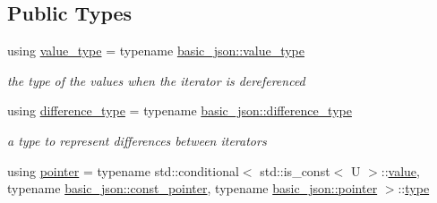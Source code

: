 \subsection*{Public Types}
\begin{DoxyCompactItemize}
\item 
using \hyperlink{classnlohmann_1_1basic__json_1_1iter__impl_a4d0518f3f2edae9dbaf7ef02f4f20add}{value\+\_\+type} = typename \hyperlink{classnlohmann_1_1basic__json_a2b3297873b70c080837e8eedc4fec32f}{basic\+\_\+json\+::value\+\_\+type}\hypertarget{classnlohmann_1_1basic__json_1_1iter__impl_a4d0518f3f2edae9dbaf7ef02f4f20add}{}\label{classnlohmann_1_1basic__json_1_1iter__impl_a4d0518f3f2edae9dbaf7ef02f4f20add}

\begin{DoxyCompactList}\small\item\em the type of the values when the iterator is dereferenced \end{DoxyCompactList}\item 
using \hyperlink{classnlohmann_1_1basic__json_1_1iter__impl_aa3d908ee643e5938d32e5f6d261d7715}{difference\+\_\+type} = typename \hyperlink{classnlohmann_1_1basic__json_afe7c1303357e19cea9527af4e9a31d8f}{basic\+\_\+json\+::difference\+\_\+type}\hypertarget{classnlohmann_1_1basic__json_1_1iter__impl_aa3d908ee643e5938d32e5f6d261d7715}{}\label{classnlohmann_1_1basic__json_1_1iter__impl_aa3d908ee643e5938d32e5f6d261d7715}

\begin{DoxyCompactList}\small\item\em a type to represent differences between iterators \end{DoxyCompactList}\item 
using \hyperlink{classnlohmann_1_1basic__json_1_1iter__impl_a3dddd7fa38b36e2531700ceb4a1ce9a8}{pointer} = typename std\+::conditional$<$ std\+::is\+\_\+const$<$ U $>$\+::\hyperlink{classnlohmann_1_1basic__json_1_1iter__impl_a2597c381f70b376336bd4faa87fadc28}{value}, typename \hyperlink{classnlohmann_1_1basic__json_aff3d5cd2a75612364b888d8693231b58}{basic\+\_\+json\+::const\+\_\+pointer}, typename \hyperlink{classnlohmann_1_1basic__json_aefee1f777198c68724bd127e0c8abbe4}{basic\+\_\+json\+::pointer} $>$\+::\hyperlink{classnlohmann_1_1basic__json_a2b2d781d7f2a4ee41bc0016e931cadf7}{type}\hypertarget{classnlohmann_1_1basic__json_1_1iter__impl_a3dddd7fa38b36e2531700ceb4a1ce9a8}{}\label{classnlohmann_1_1basic__json_1_1iter__impl_a3dddd7fa38b36e2531700ceb4a1ce9a8}


\end{DoxyCompactItemize}
